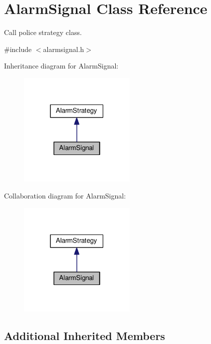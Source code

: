 \hypertarget{classAlarmSignal}{}\section{Alarm\+Signal Class Reference}
\label{classAlarmSignal}


Call police strategy class.  




{\ttfamily \#include $<$alarmsignal.\+h$>$}



Inheritance diagram for Alarm\+Signal\+:\nopagebreak
\begin{figure}[H]
\begin{center}
\leavevmode
\includegraphics[width=159pt]{classAlarmSignal__inherit__graph}
\end{center}
\end{figure}


Collaboration diagram for Alarm\+Signal\+:\nopagebreak
\begin{figure}[H]
\begin{center}
\leavevmode
\includegraphics[width=159pt]{classAlarmSignal__coll__graph}
\end{center}
\end{figure}
\subsection*{Additional Inherited Members}


